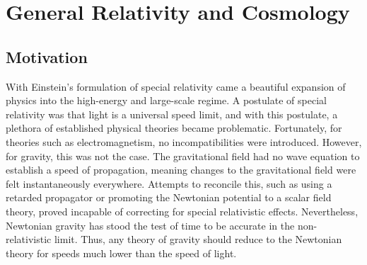 \chapter{General Relativity and Cosmology}
\section{Motivation}
With Einstein's formulation of special relativity came a beautiful expansion of physics into the high-energy and large-scale regime. A postulate of special relativity was that light is a universal speed limit, and with this postulate, a plethora of established physical theories became problematic. Fortunately, for theories such as electromagnetism, no incompatibilities were introduced. However, for gravity, this was not the case. The gravitational field had no wave equation to establish a speed of propagation, meaning changes to the gravitational field were felt instantaneously everywhere. Attempts to reconcile this, such as using a retarded propagator or promoting the Newtonian potential to a scalar field theory, proved incapable of correcting for special relativistic effects. Nevertheless, Newtonian gravity has stood the test of time to be accurate in the non-relativistic limit. Thus, any theory of gravity should reduce to the Newtonian theory for speeds much lower than the speed of light.

